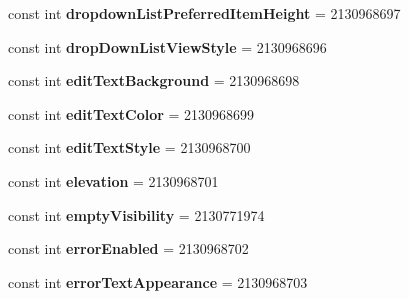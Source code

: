 \begin{DoxyCompactItemize}
\item 
\mbox{\label{classst_delivery_1_1_resource_1_1_attribute_abc86b2426fbe6e03f657dc989f1d72d4}} 
const int {\bfseries dropdown\+List\+Preferred\+Item\+Height} = 2130968697
\item 
\mbox{\label{classst_delivery_1_1_resource_1_1_attribute_a983c041be081ab7c05256393725b0bd3}} 
const int {\bfseries drop\+Down\+List\+View\+Style} = 2130968696
\item 
\mbox{\label{classst_delivery_1_1_resource_1_1_attribute_a21fe3b42433d529609a386710ddb2e3d}} 
const int {\bfseries edit\+Text\+Background} = 2130968698
\item 
\mbox{\label{classst_delivery_1_1_resource_1_1_attribute_abf7bab90c0285e64824c94b40b957bb6}} 
const int {\bfseries edit\+Text\+Color} = 2130968699
\item 
\mbox{\label{classst_delivery_1_1_resource_1_1_attribute_aef7a6bc1e345d65b8b33ec5a15c496b8}} 
const int {\bfseries edit\+Text\+Style} = 2130968700
\item 
\mbox{\label{classst_delivery_1_1_resource_1_1_attribute_ac369b3750ff369fe872f362695ab8819}} 
const int {\bfseries elevation} = 2130968701
\item 
\mbox{\label{classst_delivery_1_1_resource_1_1_attribute_ada49edde7b751ee6c29ced52b975a5bd}} 
const int {\bfseries empty\+Visibility} = 2130771974
\item 
\mbox{\label{classst_delivery_1_1_resource_1_1_attribute_a0275f86f006197bb4aecdc33f1ebd022}} 
const int {\bfseries error\+Enabled} = 2130968702
\item 
\mbox{\label{classst_delivery_1_1_resource_1_1_attribute_a8abadc13b91b3fa94ee2bf41f89b6485}} 
const int {\bfseries error\+Text\+Appearance} = 2130968703
\item 

\end{DoxyCompactItemize}
